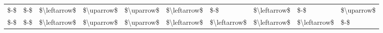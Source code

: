 \begin{tabular}{llllllllll}
         \$-\$ &          \$-\$ & \$\textbackslash leftarrow\$ &   \$\textbackslash uparrow\$ & \$\textbackslash uparrow\$ & \$\textbackslash leftarrow\$ &          \$-\$ & \$\textbackslash leftarrow\$ &          \$-\$ &   \$\textbackslash uparrow\$ \\
         \$-\$ &          \$-\$ & \$\textbackslash leftarrow\$ &   \$\textbackslash uparrow\$ & \$\textbackslash uparrow\$ & \$\textbackslash leftarrow\$ & \$\textbackslash leftarrow\$ & \$\textbackslash leftarrow\$ & \$\textbackslash leftarrow\$ &          \$-\$ \\
\bottomrule
\end{tabular}
